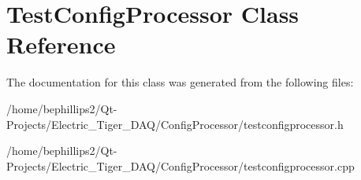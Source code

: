 \hypertarget{class_test_config_processor}{}\section{Test\+Config\+Processor Class Reference}
\label{class_test_config_processor}


The documentation for this class was generated from the following files\+:\begin{DoxyCompactItemize}
\item 
/home/bephillips2/\+Qt-\/\+Projects/\+Electric\+\_\+\+Tiger\+\_\+\+D\+A\+Q/\+Config\+Processor/testconfigprocessor.\+h\item 
/home/bephillips2/\+Qt-\/\+Projects/\+Electric\+\_\+\+Tiger\+\_\+\+D\+A\+Q/\+Config\+Processor/testconfigprocessor.\+cpp\end{DoxyCompactItemize}

